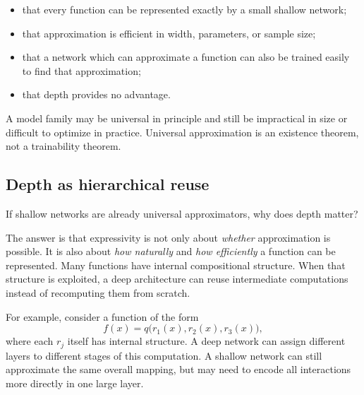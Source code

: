 \begin{itemize}
    \item that every function can be represented exactly by a small shallow network;
    \item that approximation is efficient in width, parameters, or sample size;
    \item that a network which can approximate a function can also be trained easily to find that approximation;
    \item that depth provides no advantage.
\end{itemize}

A model family may be universal in principle and still be impractical in size or difficult to optimize in practice. Universal approximation is an existence theorem, not a trainability theorem.

\subsection*{Depth as hierarchical reuse}

If shallow networks are already universal approximators, why does depth matter?

The answer is that expressivity is not only about \emph{whether} approximation is possible. It is also about \emph{how naturally} and \emph{how efficiently} a function can be represented. Many functions have internal compositional structure. When that structure is exploited, a deep architecture can reuse intermediate computations instead of recomputing them from scratch.

For example, consider a function of the form
\[
f(x)=q\bigl(r_1(x),r_2(x),r_3(x)\bigr),
\]
where each $r_j$ itself has internal structure. A deep network can assign different layers to different stages of this computation. A shallow network can still approximate the same overall mapping, but may need to encode all interactions more directly in one large layer.

